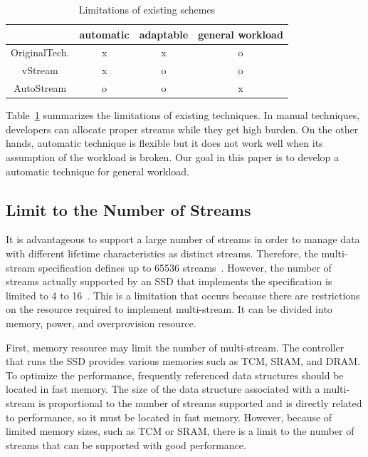 \begin{table}[b]
	\caption{Limitations of existing schemes}
	\label{tab:limitation}
	\begin{center}
		\begin {tabular}{cccc}
		\hline
                   		& automatic & adaptable & general workload \\
		\hline \hline
		OriginalTech.   &    x      &    x      &    o    \\
		\hline
		vStream         &    x      &    o      &    o    \\
		\hline
		AutoStream      &    o      &    o      &    x    \\
		\hline
	\end{tabular}
\end{center}
\end{table}

Table~\ref{tab:limitation} summarizes the limitations of existing techniques. 
In manual techniques, developers can allocate proper streams while they get 
high burden. On the other hands, automatic technique is flexible
but it does not work well when its assumption of the workload is broken. Our goal in this paper 
is to develop a automatic technique for general workload.


\subsection{Limit to the Number of Streams}
It is advantageous to support a large number of streams in order to manage data with different lifetime characteristics as distinct streams.
Therefore, the multi-stream specification defines up to 65536 streams~\cite{T10, NVMe}.
However, the number of streams actually supported by an SSD that implements the specification is limited to 4 to 16~\cite{MultiStream, Level, AutoStream}.
This is a limitation that occurs because there are restrictions on the resource required to implement multi-stream. It can be divided into memory, power, and overprovision resource.

First, memory resource may limit the number of multi-stream.
The controller that runs the SSD provides various memories such as TCM, SRAM, and DRAM. 
To optimize the performance, frequently referenced data structures should be located in fast memory.
The size of the data structure associated with a multi-stream is proportional to the number of streams supported and is directly related to performance, so it must be located in fast memory.
However, because of limited memory sizes, such as TCM or SRAM,
 there is a limit to the number of streams that can be supported with good performance.

